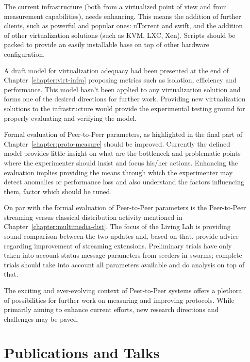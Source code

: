 The current infrastructure (both from a virtualized point of view and from
measurement capabilities), needs enhancing. This means the addition of further
clients, such as powerful and popular ones: uTorrent and swift, and the
addition of other virtualization solutions (such as KVM, LXC, Xen). Scripts
should be packed to provide an easily installable base on top of other
hardware configuration.

A draft model for virtualization adequacy had been presented at the end of
Chapter~\ref{chapter:virt-infra} proposing metrics such as isolation,
efficiency and performance. This model hasn't been applied to any
virtualization solution and forms one of the desired directions for further
work. Providing new virtualization solutions to the infrastructure would
provide the experimental testing ground for properly evaluating and verifying
the model.

Formal evaluation of Peer-to-Peer parameters, as highlighted in the final part
of Chapter~\ref{chapter:proto-measure} should be improved. Currently the
defined model provides little insight on what are the bottleneck and
problematic points where the experimenter should insist and focus his/her
actions. Enhancing the evaluation implies providing the means through which
the experimenter may detect anomalies or performance loss and also understand
the factors influencing them, factor which should be tuned.

On par with the formal evaluation of Peer-to-Peer parameters is the
Peer-to-Peer streaming versus classical distribution activity mentioned in
Chapter~\ref{chapter:multimedia-dist}. The focus of the Living Lab is
providing sound comparison between the two updates and, based on that, provide
advice regarding improvement of streaming extensions. Preliminary trials have
only taken into account status message parameters from seeders in swarms;
complete trials should take into account all parameters available and do
analysis on top of that.

The exciting and ever-evolving context of Peer-to-Peer systems offers a
plethora of possibilities for further work on measuring and improving
protocols. While primarily aiming to enhance current efforts, new research
directions and challenges may be paved.

\section{Publications and Talks}
\label{sec:conclusion:publications}

